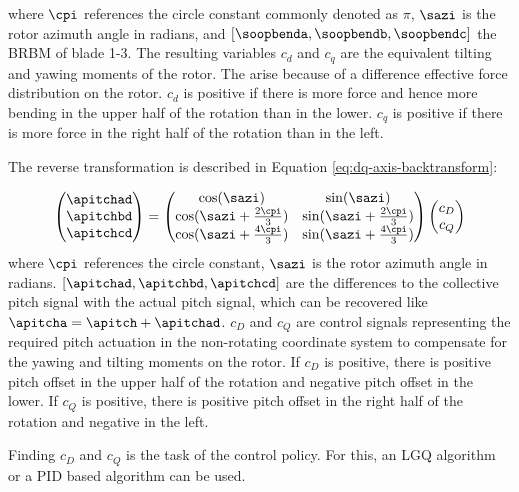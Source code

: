 where $\cpi$ references the circle constant commonly denoted as $\pi$, $\sazi$ is the rotor azimuth angle in radians, and $[\soopbenda, \soopbendb, \soopbendc]$ the \ac{BRBM} of blade 1-3. The resulting variables $c_d$ and $c_q$ are the equivalent tilting and yawing moments of the rotor. The arise because of a difference effective force distribution on the rotor. $c_d$ is positive if there is more force and hence more bending in the upper half of the rotation than in the lower. $c_q$ is positive if there is more force in the right half of the rotation than in the left.

The reverse transformation is described in Equation \ref{eq:dq-axis-backtransform}:

\begin{equation}
  \begin{pmatrix}
    \apitchad \\
    \apitchbd \\
    \apitchcd
  \end{pmatrix}
  =
  \begin{pmatrix}
    \cos(\sazi) & \sin(\sazi) \\
    \cos(\sazi + \frac{2\cpi}{3}) & \sin(\sazi + \frac{2\cpi}{3}) \\
    \cos(\sazi + \frac{4\cpi}{3}) & \sin(\sazi + \frac{4\cpi}{3})
  \end{pmatrix}
  \begin{pmatrix}
    c_D \\ c_Q
  \end{pmatrix}
\label{eq:dq-axis-backtransform}
\end{equation}
where $\cpi$ references the circle constant, $\sazi$ is the rotor azimuth angle in radians. $[\apitchad, \apitchbd, \apitchcd]$ are the differences to the collective pitch signal with the actual pitch signal, which can be recovered like $\apitcha = \apitch + \apitchad$. $c_D$ and $c_Q$ are control signals representing the required pitch actuation in the non-rotating coordinate system to compensate for the yawing and tilting moments on the rotor. If $c_D$ is positive, there is positive pitch offset in the upper half of the rotation and negative pitch offset in the lower. If $c_Q$ is positive, there is positive pitch offset in the right half of the rotation and negative in the left.

Finding $c_D$ and $c_Q$ is the task of the control policy. For this, an LGQ algorithm \cite{bossanyiIndividualBladePitch2003} or a PID based algorithm \cite{bossanyiFurtherLoadReductions2005} can be used.


